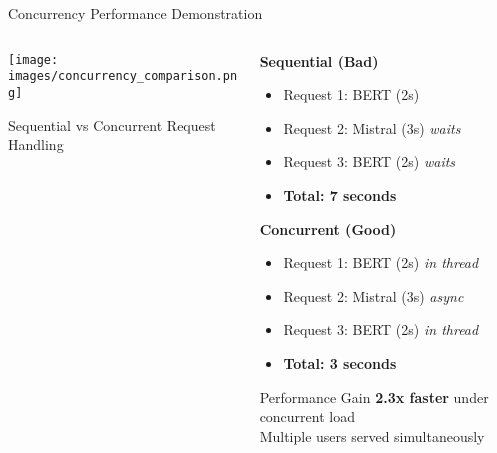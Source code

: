 \documentclass[aspectratio=169]{beamer}
\begin{document}
\begin{frame}{Concurrency Performance Demonstration}
\begin{columns}
\begin{column}{0.6\textwidth}
\begin{center}
\texttt{[image: images/concurrency\_comparison.png]}
\caption{Sequential vs Concurrent Request Handling}
\end{center}
\end{column}
\begin{column}{0.4\textwidth}
\textbf{Sequential (Bad)}
\begin{itemize}
\item Request 1: BERT (2s)
\item Request 2: Mistral (3s) \textit{waits}
\item Request 3: BERT (2s) \textit{waits}
\item \textbf{Total: 7 seconds}
\end{itemize}

\vspace{0.3cm}
\textbf{Concurrent (Good)}
\begin{itemize}
\item Request 1: BERT (2s) \textit{in thread}
\item Request 2: Mistral (3s) \textit{async}
\item Request 3: BERT (2s) \textit{in thread}
\item \textbf{Total: 3 seconds}
\end{itemize}

\vspace{0.3cm}
\begin{alertblock}{Performance Gain}
\textbf{2.3x faster} under concurrent load\\
Multiple users served simultaneously
\end{alertblock}
\end{column}
\end{columns}
\end{frame}
\end{document}
